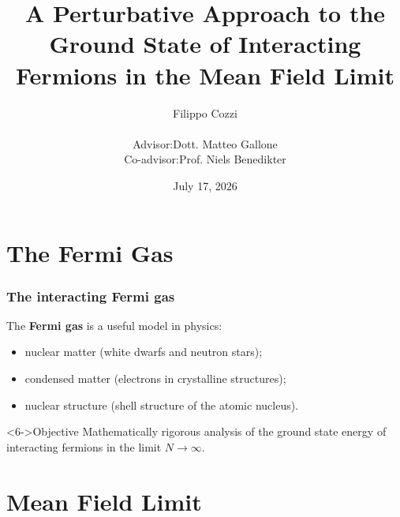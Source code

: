 \documentclass{beamer}
\title{A Perturbative Approach to the Ground State of Interacting Fermions in the Mean Field
Limit}
\author{
	Filippo Cozzi\\[1em]
	\small
	\begin{tabular}{l l} %
        Advisor:    & Dott. Matteo Gallone \\
        Co-advisor: & Prof. Niels Benedikter \\
    \end{tabular}
}
\date{July 17, 2026}
\begin{document}
\frame{\titlepage}

\section{The Fermi Gas}

\begin{frame}
	\frametitle{The interacting Fermi gas}
	The \textbf{Fermi gas} is a useful model in physics:
	\begin{itemize}
		\item<2-> nuclear matter (white dwarfs and neutron stars);
		\item<3-> condensed matter (electrons in crystalline structures);
		\item<4-> nuclear structure (shell structure of the atomic nucleus).
	\end{itemize}
	\vfill
	\vfill
	\begin{block}<6->{Objective}
		Mathematically rigorous analysis of the ground state energy of interacting fermions
		in the limit $N\to\infty$.
	\end{block}
\end{frame}

\section{Mean Field Limit}
\end{document}
